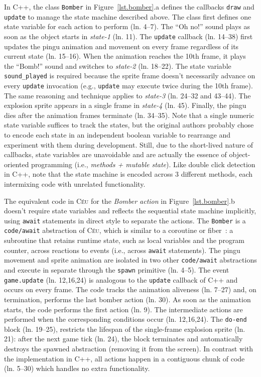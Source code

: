 \documentclass{vgtc}                          %
\newcommand{\CEU}{\textsc{C\'{e}u}\xspace}
\newcommand{\code}[1] {{\small{\texttt{#1}}}}
\begin{document}
In C++, the class \code{Bomber} in Figure~\ref{lst.bomber}.a defines the
callbacks \code{draw} and \code{update} to manage the state machine described
above.
%
The class first defines one state variable for each action to perform
(ln. 4--7).
The ``Oh no!'' sound plays as soon as the object starts in \emph{state-1} 
(ln. 11).
The \code{update} callback (ln. 14--38) first updates the pingu animation and
movement on every frame regardless of its current state (ln. 15--16).
When the animation reaches the 10th frame, it plays the ``Bomb!'' sound and 
switches to \emph{state-2} (ln. 18--22).
The state variable \code{sound\_played} is required because the sprite frame
doesn't necessarily advance on every \code{update} invocation (e.g.,
\code{update} may execute twice during the 10th frame).
The same reasoning and technique applies to \emph{state-3} (ln. 24--32 and
43--44).
The explosion sprite appears in a single frame in \emph{state-4} (ln. 45).
Finally, the pingu dies after the animation frames terminate (ln. 34--35).
%
Note that a single numeric state variable suffices to track the states, but the
original authors probably chose to encode each state in an independent boolean 
variable to rearrange and experiment with them during development.
Still, due to the short-lived nature of callbacks, state variables are 
unavoidable and are actually the essence of object-oriented programming
(i.e., \emph{methods + mutable state}).
%
Like double click detection in C++, note that the state machine is encoded
across 3 different methods, each intermixing code with unrelated functionality.

The equivalent code in \CEU for the \emph{Bomber action} in
Figure~\ref{lst.bomber}.b doesn't require state variables and reflects the
sequential state machine implicitly, using \code{await} statements in direct
style to separate the actions.
%
The \code{Bomber} is a \code{code/await} abstraction of \CEU, which is similar
to a coroutine or fiber~\cite{sync_async.cooperative}: a subroutine that
retains runtime state, such as local variables and the program counter, across
reactions to events (i.e., across \code{await} statements).
The pingu movement and sprite animation are isolated in two other
\code{code/await} abstractions and execute in separate through the \code{spawn}
primitive (ln. 4--5).
The event \code{game.update} (ln. 12,16,24) is analogous to the \code{update}
callback of C++ and occurs on every frame.
%
The code tracks the animation aliveness (ln. 7--27) and, on termination,
performs the last bomber action (ln. 30).
As soon as the animation starts, the code performs the first action (ln. 9).
The intermediate actions are performed when the corresponding conditions occur
(ln. 12,16,24).
The \code{do-end} block (ln. 19--25), restricts the lifespan of the
single-frame explosion sprite (ln. 21): after the next game tick (ln. 24), the
block terminates and automatically destroys the spawned abstraction (removing
it from the screen).
%
In contrast with the implementation in C++, all actions happen in a contiguous
chunk of code (ln. 5--30) which handles no extra functionality.
\end{document}
